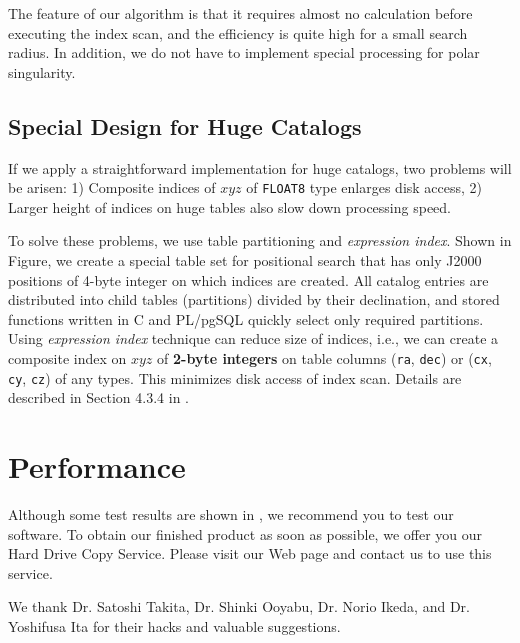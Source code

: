 The feature of our algorithm is that it requires almost no calculation
before executing the index scan, and the efficiency is quite high for a
small search radius.
In addition, we do not have to implement special processing for polar
singularity.

\subsection{Special Design for Huge Catalogs}

\begin{figure}[t]
\end{figure}

If we apply a straightforward implementation
for huge catalogs, two problems will be arisen: 
1) Composite indices of $x$$y$$z$
of {\tt FLOAT8} type enlarges disk access,
2) Larger height of indices on huge tables also slow down processing speed.

To solve these problems,
we use table partitioning and {\it expression index}.
Shown in Figure, 
we create a special table set for positional search
that has only J2000 positions of 4-byte integer on which indices are created.
All catalog entries are distributed into child tables (partitions)
divided by their declination, and
stored functions written in C and PL/pgSQL quickly select only required
partitions.
Using {\it expression index} technique can reduce size of indices, i.e.,
we can create a composite index on $x$$y$$z$ of
{\bf 2-byte integers} on table columns  
({\tt ra}, {\tt dec}) or ({\tt cx}, {\tt cy}, {\tt cz}) of any types.  
This minimizes disk access of index scan.
Details are described in Section 4.3.4 in \citet{yam_2011a}.


\section{Performance}

Although some test results are shown in \citet{yam_2011a},
we recommend you to test our software. 
To obtain our finished product as soon as possible,
we offer you our Hard Drive Copy Service. 
Please visit our Web page and contact us to use this service. 

\acknowledgements We thank 
Dr. Satoshi Takita, Dr. Shinki Ooyabu, Dr. Norio Ikeda, and Dr. Yoshifusa Ita
for their hacks and valuable suggestions.


